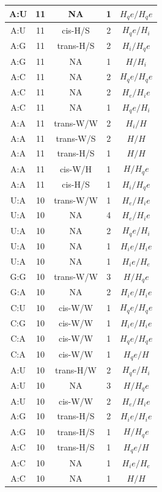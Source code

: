 \begin{center}
\begin{longtable}{c|c|c|c|c}
A:U & 11 & NA & 1 & $H_qe/H_qe$ \\  \hline
A:U & 11 & cis-H/S & 2 & $H_qe/H_i$ \\  \hline
A:G & 11 & trans-H/S & 2 & $H_i/H_qe$ \\  \hline
A:G & 11 & NA & 1 & $H/H_i$ \\  \hline
A:C & 11 & NA & 2 & $H_qe/H_qe$ \\  \hline
A:C & 11 & NA & 2 & $H_e/H_ie$ \\  \hline
A:C & 11 & NA & 1 & $H_qe/H_i$ \\  \hline
A:A & 11 & trans-W/W & 2 & $H_i/H$ \\  \hline
A:A & 11 & trans-W/S & 2 & $H/H$ \\  \hline
A:A & 11 & trans-H/S & 1 & $H/H$ \\  \hline
A:A & 11 & cis-W/H & 1 & $H/H_qe$ \\  \hline
A:A & 11 & cis-H/S & 1 & $H_i/H_qe$ \\  \hline
U:A & 10 & trans-W/W & 1 & $H_e/H_ie$ \\  \hline
U:A & 10 & NA & 4 & $H_e/H_ie$ \\  \hline
U:A & 10 & NA & 2 & $H_qe/H_i$ \\  \hline
U:A & 10 & NA & 1 & $H_ie/H_ie$ \\  \hline
U:A & 10 & NA & 1 & $H_ie/H_e$ \\  \hline
G:G & 10 & trans-W/W & 3 & $H/H_qe$ \\  \hline
G:A & 10 & NA & 2 & $H_ie/H_ie$ \\  \hline
C:U & 10 & cis-W/W & 1 & $H_qe/H_qe$ \\  \hline
C:G & 10 & cis-W/W & 1 & $H_ie/H_ie$ \\  \hline
C:A & 10 & cis-W/W & 1 & $H_qe/H_qe$ \\  \hline
C:A & 10 & cis-W/W & 1 & $H_qe/H$ \\  \hline
A:U & 10 & trans-H/W & 2 & $H_qe/H_i$ \\  \hline
A:U & 10 & NA & 3 & $H/H_qe$ \\  \hline
A:U & 10 & cis-W/W & 2 & $H_e/H_ie$ \\  \hline
A:G & 10 & trans-H/S & 2 & $H_ie/H_ie$ \\  \hline
A:G & 10 & trans-H/S & 1 & $H/H_qe$ \\  \hline
A:C & 10 & trans-H/S & 1 & $H_qe/H$ \\  \hline
A:C & 10 & NA & 1 & $H_ie/H_e$ \\  \hline
A:C & 10 & NA & 1 & $H/H$ \\  \hline

\end{longtable}
\end{center}
